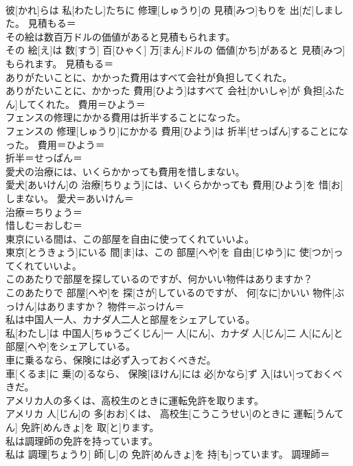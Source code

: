 \documentclass[8pt]{extreport}
\begin{document}
\begin{CJK}{UTF8}{min}
\\	彼[かれ]らは 私[わたし]たちに 修理[しゅうり]の 見積[みつ]もりを 出[だ]しました。	見積もる＝ 
\\	その絵は数百万ドルの価値があると見積もられます。	
\\	その 絵[え]は 数[すう] 百[ひゃく] 万[まん]ドルの 価値[かち]があると 見積[みつ]もられます。	見積もる＝ 
\\	ありがたいことに、かかった費用はすべて会社が負担してくれた。	
\\	ありがたいことに、かかった 費用[ひよう]はすべて 会社[かいしゃ]が 負担[ふたん]してくれた。	費用＝ひよう＝ 
\\	フェンスの修理にかかる費用は折半することになった。	
\\	フェンスの 修理[しゅうり]にかかる 費用[ひよう]は 折半[せっぱん]することになった。	費用＝ひよう＝ 
\\	折半＝せっぱん＝ 
\\	愛犬の治療には、いくらかかっても費用を惜しまない。	
\\	愛犬[あいけん]の 治療[ちりょう]には、いくらかかっても 費用[ひよう]を 惜[お]しまない。	愛犬＝あいけん＝ 
\\	治療＝ちりょう＝ 
\\	惜しむ＝おしむ＝ 
\\	東京にいる間は、この部屋を自由に使ってくれていいよ。	
\\	東京[とうきょう]にいる 間[ま]は、この 部屋[へや]を 自由[じゆう]に 使[つか]ってくれていいよ。	
\\	このあたりで部屋を探しているのですが、何かいい物件はありますか？	
\\	このあたりで 部屋[へや]を 探[さが]しているのですが、 何[なに]かいい 物件[ぶっけん]はありますか？	物件＝ぶっけん＝ 
\\	私は中国人一人、カナダ人二人と部屋をシェアしている。	
\\	私[わたし]は 中国人[ちゅうごくじん]一 人[にん]、カナダ 人[じん]二 人[にん]と 部屋[へや]をシェアしている。	
\\	車に乗るなら、保険には必ず入っておくべきだ。	
\\	車[くるま]に 乗[の]るなら、 保険[ほけん]には 必[かなら]ず 入[はい]っておくべきだ。	
\\	アメリカ人の多くは、高校生のときに運転免許を取ります。	
\\	アメリカ 人[じん]の 多[おお]くは、 高校生[こうこうせい]のときに 運転[うんてん] 免許[めんきょ]を 取[と]ります。	
\\	私は調理師の免許を持っています。	
\\	私は 調理[ちょうり] 師[し]の 免許[めんきょ]を 持[も]っています。	調理師＝ 

\end{CJK}
\end{document}
